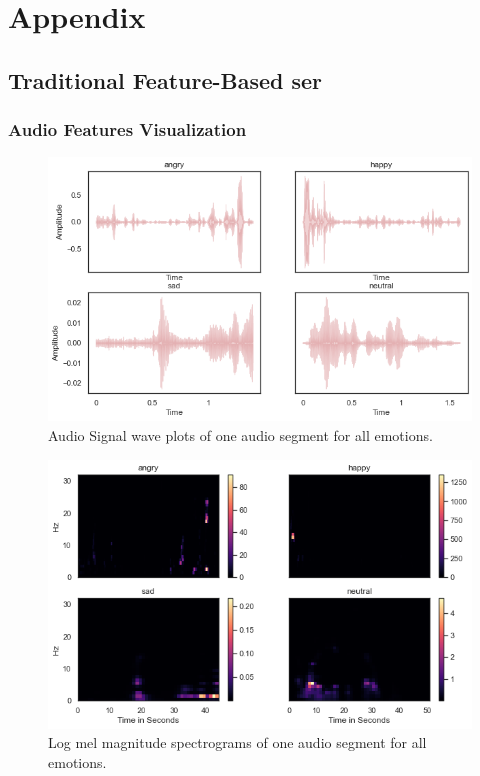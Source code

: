 \chapter{Appendix}

\appendix \label{appendix}

\section{Traditional Feature-Based \ac{ser}}

\subsection{Audio Features Visualization} \label{app:1}

\begin{figure}[H]
	\centering
	\includegraphics[width=\linewidth]{figs/appendix/feature_selection/signalWP.png}
	\caption{Audio Signal wave plots of one audio segment for all emotions.}
	\label{fig:signalWP}
\end{figure}

\begin{figure}[H]
	\centering
	\includegraphics[width=\linewidth]{figs/appendix/feature_selection/melSpect.png}
	\caption{Log mel magnitude spectrograms of one audio segment for all emotions.}
	\label{fig:melSpect}
\end{figure}

